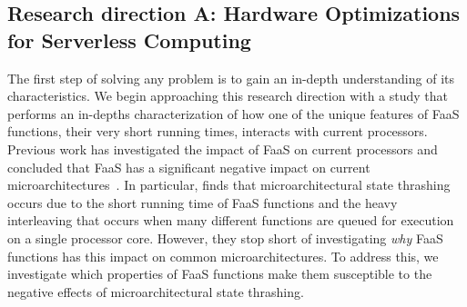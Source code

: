 \documentclass[../main.tex]{subfiles}
\begin{document}
\begin{refsection}
\subsection{Research direction A: Hardware Optimizations for Serverless Computing}
\label{sec:rda}

The first step of solving any problem is to gain an in-depth
understanding of its characteristics. We begin approaching this
research direction with a study that performs an in-depths
characterization of how one of the unique features of FaaS functions,
their very short running times, interacts with current processors. Previous work has investigated the impact of FaaS on current
processors and concluded that FaaS has a significant negative impact on
current
microarchitectures~\cite{shahrad19_archit_implic_funct_servic_comput,lukewarm_serverless}. In
particular, \textcite{lukewarm_serverless} finds that
microarchitectural state thrashing occurs due to the short running
time of FaaS functions and the heavy interleaving that occurs when
many different functions are queued for execution on a single
processor core. However, they stop short of investigating \emph{why}
FaaS functions has this impact on common microarchitectures. To
address this, we investigate which properties of FaaS functions make
them susceptible to the negative effects of microarchitectural state
thrashing.




\end{refsection}
\end{document}

